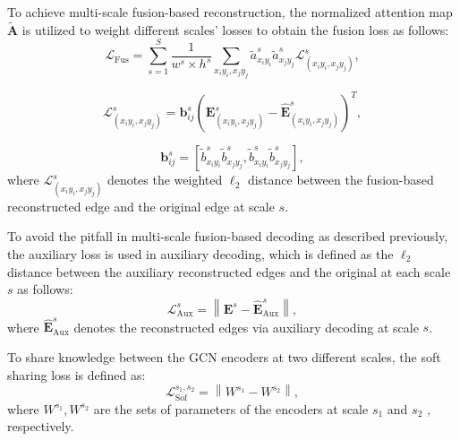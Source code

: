 \documentclass[journal]{IEEEtran}
\begin{document}
To achieve multi-scale fusion-based reconstruction, the normalized attention map $\widetilde{\mathbf{A}}$ is utilized to weight different scales' losses to obtain the fusion loss as follows:
\begin{equation}
\mathcal{L}_{\mathrm{Fus}}\!=
\sum_{s=1}^{S}
\frac{1}{w^{s}\! \times \!h^{s}}\!
\sum_{x_i y_i,x_j y_j}\!
\widetilde{a}_{x_i y_i}^{s}
\widetilde{a}_{x_j y_j}^{s}
\mathcal{L}_{(x_i y_i,x_j y_j)}^{s},
\end{equation}

\begin{equation}
\mathcal{L}_{(x_i y_i,x_j y_j)}^{s} = \mathbf{b}_{ij}^{s} \left(\mathbf{E}_{(x_i y_i,x_j y_j)}^{s}-\hat{\mathbf{E}}_{(x_i y_i,x_j y_j)}^{s}\right)^T ,
\end{equation}

\begin{equation}
\mathbf{b}_{ij}^{s} = 
[ \widetilde{b}_{x_i y_i}^{s}\widetilde{b}_{x_j y_j}^{s},\widetilde{b}_{x_i y_i}^{s}\widetilde{b}_{x_j y_j}^{s} ] ,
\end{equation}
where $\mathcal{L}_{(x_i y_i,x_j y_j)}^{s}$ denotes the weighted $\ell_2$ distance between the fusion-based reconstructed edge and the original edge at scale $s$.


To avoid the pitfall in multi-scale fusion-based decoding as described previously, the auxiliary loss is used in auxiliary decoding, which is defined as the $\ell_2$ distance between the auxiliary reconstructed edges and the original at each scale $s$ as follows:
\begin{equation}
\mathcal{L}_{\mathrm{Aux}}^{s}=
\left\|\mathbf{E}^{s}-\hat{\mathbf{E}}^s_{\mathrm{Aux}}\right\|,
\end{equation}
where $\hat{\mathbf{E}}^{s}_{\mathrm{Aux}}$ denotes the reconstructed edges via auxiliary decoding at scale $s$.

To share knowledge between the GCN encoders at two different scales, the soft sharing loss is defined as:
\begin{equation}
\mathcal{L}^{s_1,s_2}_{\mathrm{Sof}}=\left\|W^{s_{1}}-W^{s_{2}}\right\|,
\end{equation}
where $W^{s_{1}},W^{s_{2}}$ are the sets of parameters of the encoders at scale $s_1$ and $s_2$ , respectively.
\end{document}
